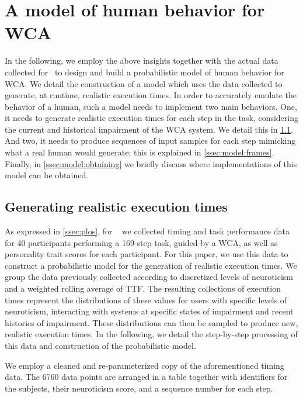 \section{A model of human behavior for \ac{WCA}}\label{sec:model}

In the following, we employ the above insights together with the actual data collected for~\cite{olguinmunoz:impact2021} to design and build a probabilistic model of human behavior for \ac{WCA}.
We detail the construction of a model which uses the data collected to generate, at runtime, realistic execution times. 
In order to accurately emulate the behavior of a human, such a model needs to implement two main behaviors.
One, it needs to generate realistic execution times for each step in the task, considering the current and historical impairment of the \ac{WCA} system.
We detail this in \cref{ssec:model:exectimes}.
And two, it needs to produce sequences of input samples for each step mimicking what a real human would generate; this is explained in \cref{ssec:model:frames}.
Finally, in \cref{ssec:model:obtaining} we briefly discuss where implementations of this model can be obtained.

\subsection{Generating realistic execution times}\label{ssec:model:exectimes}

As expressed in \cref{ssec:plos}, for ~\cite{olguinmunoz:impact2021} we collected timing and task performance data for \num{40} participants performing a \num{169}-step task, guided by a \ac{WCA}, as well as personality trait scores for each participant.
For this paper, we use this data to construct a probabilistic model for the generation of realistic execution times.
We group the data previously collected according to discretized levels of neuroticism and a weighted rolling average of \ac{TTF}.
The resulting collections of execution times represent the distributions of these values for users with specific levels of neuroticism, interacting with systems at specific states of impairment and recent histories of impairment.
These distributions can then be sampled to produce new, realistic execution times.
In the following, we detail the step-by-step processing of this data and construction of the probabilistic model.

We employ a cleaned and re-parameterized copy of the aforementioned timing data.
The \num{6760} data points are arranged in a table together with identifiers for the subjects, their neuroticism score, and a sequence number for each step.

